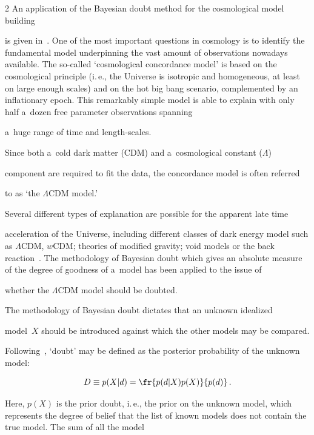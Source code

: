 \begin{multicols}{2}
  An application of the Bayesian doubt method for the cosmological model building


  is given in~\cite{32-kl, 42-kl}. One of the most important questions in cosmology is to identify the fundamental model underpinning the vast amount of observations nowadays available. The so-called `cosmological concordance model' is based on the cosmological principle (i.\,e., the Universe is isotropic and homogeneous, at least on large enough scales) and on the hot big bang scenario, complemented by an inflationary epoch. This remarkably simple model is able to explain with only half a~dozen free parameter observations spanning


  a~huge range of time and length-scales.


Since both a~cold dark matter (CDM) and a~cosmological constant ($\Lambda$)


component are required to fit the data, the concordance model is often referred


to as `the $\Lambda$CDM model.'





   Several different types of explanation are possible for the apparent late time


acceleration of the Universe, including different classes of dark energy model such as $\Lambda$CDM, $w$CDM; theories of modified gravity; void models or the back reaction~\cite{32-kl}. The methodology of Bayesian doubt which gives an absolute measure of the degree of goodness of a~model has been applied to the issue of


whether the $\Lambda$CDM model should be doubted.





  The methodology of Bayesian doubt dictates that an unknown idealized


model~$X$ should be introduced against which the other models may be compared.


Following~\cite{41-kl}, `doubt' may be defined as the posterior probability of the unknown model:


  $$


  D \equiv  p(X\vert d) = \fr{p(d\vert X)p(X)}{p(d)}\,.


  $$


  Here, $p(X)$ is the prior doubt, i.\,e., the prior on the unknown model, which represents the degree of belief that the list of known models does not contain the true model. The sum of  all the model



\end{multicols}
